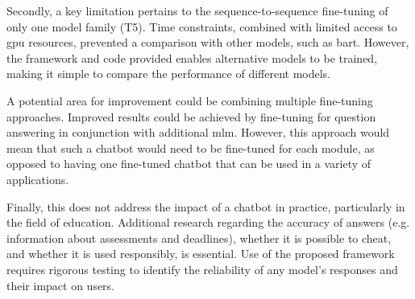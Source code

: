 Secondly, a key limitation pertains to the sequence-to-sequence fine-tuning of only one model family (T5). Time constraints, combined with limited access to \acrshort{gpu} resources, prevented a comparison with other models, such as \acrshort{bart}. However, the framework and code provided enables alternative models to be trained, making it simple to compare the performance of different models.

A potential area for improvement could be combining multiple fine-tuning approaches. Improved results could be achieved by fine-tuning for question answering in conjunction with additional \acrlong{mlm}. However, this approach would mean that such a chatbot would need to be fine-tuned for each module, as opposed to having one fine-tuned chatbot that can be used in a variety of applications.

Finally, this \papertype does not address the impact of a chatbot in practice, particularly in the field of education. Additional research regarding the accuracy of answers (e.g. information about assessments and deadlines), whether it is possible to cheat, and whether it is used responsibly, is essential. Use of the proposed framework requires rigorous testing to identify the reliability of any model's responses and their impact on users.

